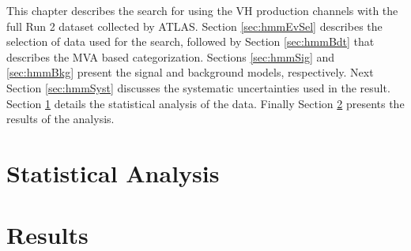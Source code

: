 This chapter describes the search for \hmm using the VH production channels with the full Run 2 dataset collected by ATLAS.
Section \ref{sec:hmmEvSel} describes the selection of data used for the search, followed by Section \ref{sec:hmmBdt} that describes the MVA based categorization.
Sections \ref{sec:hmmSig} and \ref{sec:hmmBkg} present the signal and background models, respectively.
Next Section \ref{sec:hmmSyst} discusses the systematic uncertainties used in the result.
Section \ref{sec:hmmStat} details the statistical analysis of the data.
Finally Section \ref{sec:hmmResults} presents the results of the analysis.







\section{Statistical Analysis}\label{sec:hmmStat}
\section{Results}\label{sec:hmmResults}

